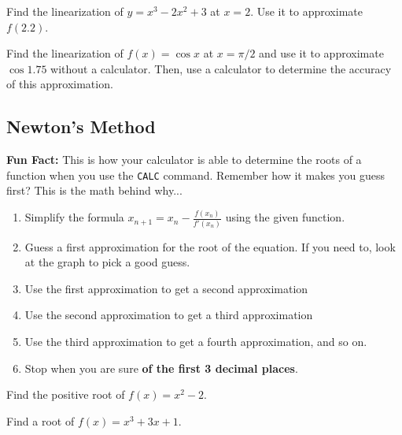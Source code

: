 \documentclass[addpoints, 12pt]{exam}
\begin{document}
\newpage

\begin{questions}
    \question Find the linearization of $y=x^3-2x^2+3$ at $x=2$. Use it to approximate $f(2.2)$.
    
    \question Find the linearization of $f(x)=\cos x$ at $x=\pi/2$ and use it to approximate $\cos 1.75$ without a calculator. Then, use a calculator to determine the accuracy of this approximation.
\end{questions}

\subsection*{Newton's Method}
\textbf{Fun Fact:} This is how your calculator is able to determine the roots of a function when you use the \texttt{CALC} command. Remember how it makes you guess first? This is the math behind why...

\begin{tcolorbox}[title= STEPS FOR NEWTON's METHOD,black,sharp corners,colback=white,colbacktitle=white,coltitle=black,boxrule=1pt]

    \begin{enumerate}
        \item Simplify the formula $\displaystyle x_{n+1}=x_n-\frac{f(x_n)}{f'(x_{n})}$ using the given function.
        \item Guess a first approximation for the root of the equation. If you need to, look at the graph to pick a good guess.
        \item Use the first approximation to get a second approximation
        \item Use the second approximation to get a third approximation
        \item Use the third approximation to get a fourth approximation, and so on.
        \item Stop when you are sure \textbf{of the first 3 decimal places}.
    \end{enumerate}
    
\end{tcolorbox}

\begin{questions}
    
    \begin{minipage}{0.45\linewidth}
        \question Find the positive root of $f(x)=x^2-2$.    
    \end{minipage}
    \hfill
    \begin{minipage}{0.45\linewidth}
        \question Find a root of $f(x)=x^3+3x+1$.
    \end{minipage}
    
    
\end{questions}
\end{document}
